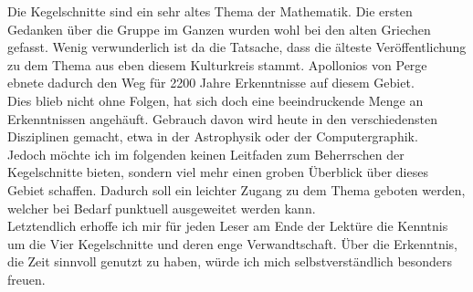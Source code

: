 Die Kegelschnitte sind ein sehr altes Thema der Mathematik. Die ersten Gedanken über die Gruppe im Ganzen wurden wohl bei den alten Griechen gefasst. Wenig verwunderlich ist da die Tatsache, dass die älteste Veröffentlichung zu dem Thema aus eben diesem Kulturkreis stammt. Apollonios von Perge~\cite{Perge:1967} ebnete dadurch den Weg für 2200 Jahre Erkenntnisse auf diesem Gebiet.\\
Dies blieb nicht ohne Folgen, hat sich doch eine beeindruckende Menge an Erkenntnissen angehäuft. Gebrauch davon wird heute in den verschiedensten Disziplinen gemacht, etwa in der Astrophysik oder der Computergraphik.\\
Jedoch möchte ich im folgenden keinen Leitfaden zum Beherrschen der Kegelschnitte bieten, sondern viel mehr einen groben Überblick über dieses Gebiet schaffen. Dadurch soll ein leichter Zugang zu dem Thema geboten werden, welcher bei Bedarf punktuell ausgeweitet werden kann.\\
Letztendlich erhoffe ich mir für jeden Leser am Ende der Lektüre die Kenntnis um die Vier Kegelschnitte und deren enge Verwandtschaft. Über die Erkenntnis, die Zeit sinnvoll genutzt zu haben, würde ich mich selbstverständlich besonders freuen.\\